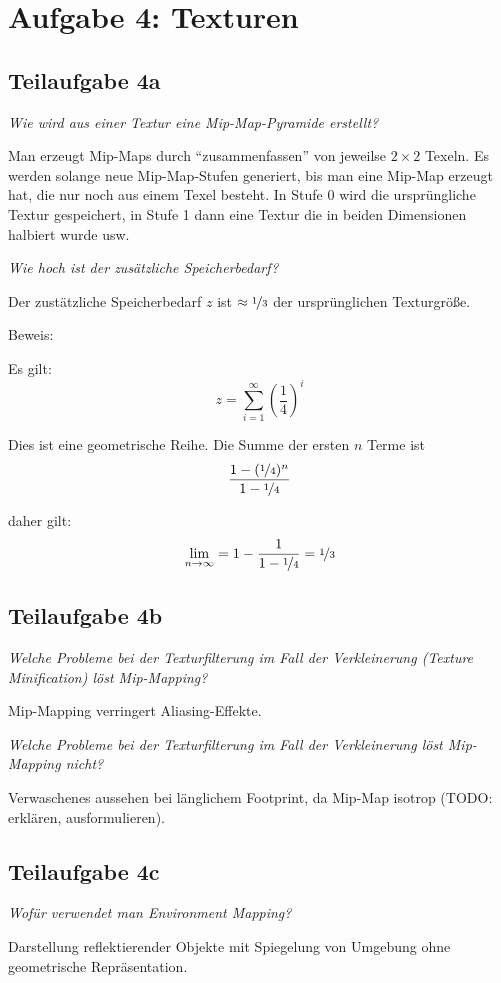 \documentclass[a4paper]{scrartcl}
\begin{document}
\section*{Aufgabe 4: Texturen}
\subsection*{Teilaufgabe 4a}
\textit{Wie wird aus einer Textur eine Mip-Map-Pyramide erstellt?}

Man erzeugt Mip-Maps durch \enquote{zusammenfassen} von jeweilse $2 \times 2$
Texeln. Es werden solange neue Mip-Map-Stufen generiert, bis man eine Mip-Map
erzeugt hat, die nur noch aus einem Texel besteht. In Stufe 0 wird die
ursprüngliche Textur gespeichert, in Stufe 1 dann eine Textur die in beiden
Dimensionen halbiert wurde usw.

\textit{Wie hoch ist der zusätzliche Speicherbedarf?}

Der zustätzliche Speicherbedarf $z$ ist $\approx \nicefrac{1}{3}$ der ursprünglichen
Texturgröße.

Beweis:

Es gilt:
\[z = \sum_{i=1}^\infty \left (\frac{1}{4} \right )^i\]

Dies ist eine geometrische Reihe. Die Summe der ersten $n$ Terme ist
\[\frac{1- (\nicefrac{1}{4})^n}{1 - \nicefrac{1}{4}}\]

daher gilt:
\[\lim_{n \rightarrow \infty} = 1 - \frac{1}{1 - \nicefrac{1}{4}} = \nicefrac{1}{3}\]

\subsection*{Teilaufgabe 4b}
\textit{Welche Probleme bei der Texturfilterung im Fall der Verkleinerung (Texture Minification) löst Mip-Mapping?}

Mip-Mapping verringert Aliasing-Effekte.

\textit{Welche Probleme bei der Texturfilterung im Fall der Verkleinerung löst Mip-Mapping nicht?}

Verwaschenes aussehen bei länglichem Footprint, da Mip-Map isotrop (TODO: erklären, ausformulieren).

\subsection*{Teilaufgabe 4c}
\textit{Wofür verwendet man Environment Mapping?}

Darstellung reflektierender Objekte mit Spiegelung von Umgebung ohne
geometrische Repräsentation.
\end{document}
